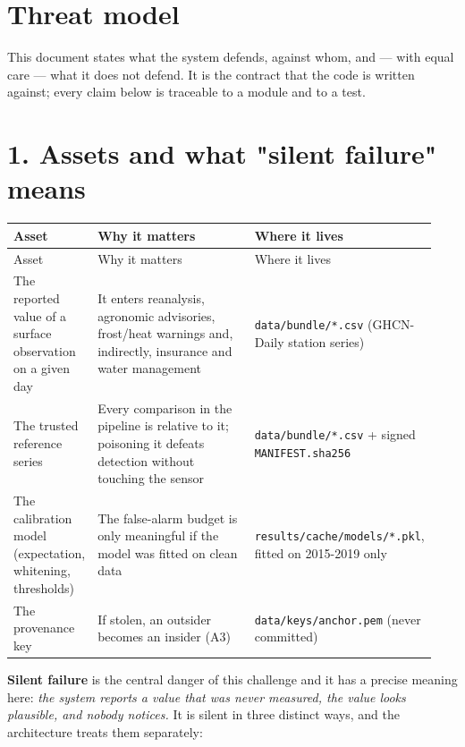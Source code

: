 \documentclass[10pt,a4paper]{article}
\begin{document}
\clearpage
\section*{Threat model}
This document states what the system defends, against whom, and — with equal care — what it does not defend. It is the contract that the code is written against; every claim below is traceable to a module and to a test.

\section*{1. Assets and what "silent failure" means}
{\small
\setlength{\tabcolsep}{4.5pt}
\setlength{\LTleft}{\fill}
\setlength{\LTright}{\fill}
\begin{longtable}{>{\raggedright\arraybackslash}p{0.184\linewidth}>{\raggedright\arraybackslash}p{0.393\linewidth}>{\raggedright\arraybackslash}p{0.358\linewidth}}
\toprule
Asset & Why it matters & Where it lives \\
\midrule
\endfirsthead
\toprule
Asset & Why it matters & Where it lives \\
\midrule
\endhead
\bottomrule
\endlastfoot
The reported value of a surface observation on a given day & It enters reanalysis, agronomic advisories, frost/\allowbreak{}heat warnings and, indirectly, insurance and water management & \texttt{data/\allowbreak{}bundle/\allowbreak{}*.csv} (GHCN-\allowbreak{}Daily station series) \\
The trusted reference series & Every comparison in the pipeline is relative to it; poisoning it defeats detection without touching the sensor & \texttt{data/\allowbreak{}bundle/\allowbreak{}*.csv} + signed \texttt{MANIFEST.sha256} \\
The calibration model (expectation, whitening, thresholds) & The false-\allowbreak{}alarm budget is only meaningful if the model was fitted on clean data & \texttt{results/\allowbreak{}cache/\allowbreak{}models/\allowbreak{}*.pkl}, fitted on 2015-\allowbreak{}2019 only \\
The provenance key & If stolen, an outsider becomes an insider (A3) & \texttt{data/\allowbreak{}keys/\allowbreak{}anchor.pem} (never committed) \\
\end{longtable}
}

\textbf{Silent failure} is the central danger of this challenge and it has a precise meaning here: \emph{the system reports a value that was never measured, the value looks plausible, and nobody notices.} It is silent in three distinct ways, and the architecture treats them separately:
\end{document}

